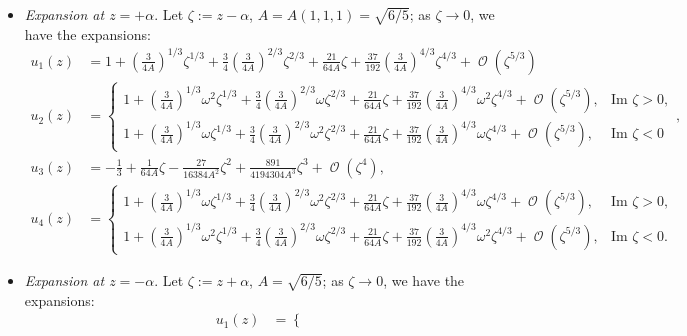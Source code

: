 \documentclass[usenames,dvipsnames]{article}
\theoremstyle{definition}
\DeclareMathOperator{\OO}{\mathcal{O}}
\numberwithin{equation}{section}
\numberwithin{figure}{section}
\begin{document}
\begin{itemize}
    \item \textit{Expansion at $z= +\alpha$}. Let $\zeta:=z-\alpha$, $A = A(1,1,1)=\sqrt{6/5}$; as $\zeta\to 0$, we have the expansions:
        \begin{align}
            u_1(z) &= 1+ \left(\frac{3}{4A}\right)^{1/3}\zeta^{1/3} + \frac{3}{4}\left(\frac{3}{4A}\right)^{2/3}\zeta^{2/3} + \frac{21}{64A}\zeta + \frac{37}{192}\left(\frac{3}{4A}\right)^{4/3}\zeta^{4/3} + \OO( \zeta^{5/3})\\
            u_2(z) &=
            \begin{cases}
                1+ \left(\frac{3}{4A}\right)^{1/3}\omega^2\zeta^{1/3} + \frac{3}{4}\left(\frac{3}{4A}\right)^{2/3}\omega\zeta^{2/3} + \frac{21}{64A}\zeta + \frac{37}{192}\left(\frac{3}{4A}\right)^{4/3}\omega^2\zeta^{4/3} + \OO( \zeta^{5/3}),
                & \text{Im }\zeta >0,\\
                 1+ \left(\frac{3}{4A}\right)^{1/3}\omega\zeta^{1/3} + \frac{3}{4}\left(\frac{3}{4A}\right)^{2/3}\omega^2\zeta^{2/3} + \frac{21}{64A}\zeta + \frac{37}{192}\left(\frac{3}{4A}\right)^{4/3}\omega\zeta^{4/3} + \OO( \zeta^{5/3}), & \text{Im }\zeta <0
            \end{cases},\\
            u_3(z) &=-\frac{1}{3} + \frac{1}{64A}\zeta - \frac{27}{16384A^2}\zeta^2 + \frac{891}{4194304A^3}\zeta^3 + \OO(\zeta^4),\\
            u_4(z) &=
            \begin{cases}
                1+ \left(\frac{3}{4A}\right)^{1/3}\omega\zeta^{1/3} + \frac{3}{4}\left(\frac{3}{4A}\right)^{2/3}\omega^2\zeta^{2/3} + \frac{21}{64A}\zeta + \frac{37}{192}\left(\frac{3}{4A}\right)^{4/3}\omega\zeta^{4/3} + \OO( \zeta^{5/3}), & \text{Im }\zeta >0,\\
                1+ \left(\frac{3}{4A}\right)^{1/3}\omega^2\zeta^{1/3} + \frac{3}{4}\left(\frac{3}{4A}\right)^{2/3}\omega\zeta^{2/3} + \frac{21}{64A}\zeta + \frac{37}{192}\left(\frac{3}{4A}\right)^{4/3}\omega^2\zeta^{4/3} + \OO( \zeta^{5/3}), & \text{Im }\zeta <0.
            \end{cases}
        \end{align}
    \item \textit{Expansion at $z= -\alpha$}. Let $\zeta:=z+\alpha$, $A=\sqrt{6/5}$; as $\zeta\to 0$, we have the expansions:
        \begin{align}
            u_1(z) &= 
            \begin{cases}

\end{cases}
\end{align}
\end{itemize}
\end{document}
